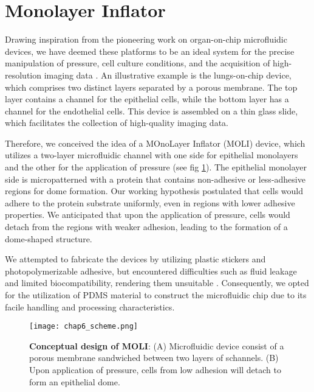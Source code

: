 \hypertarget{monolayer-inflator}{%
\section{Monolayer Inflator}\label{monolayer-inflator}}

Drawing inspiration from the pioneering work on organ-on-chip microfluidic devices, we have deemed these platforms to be an ideal system for the precise manipulation of pressure, cell culture conditions, and the acquisition of high-resolution imaging data \cite{huh2010, nelson2017}. An illustrative example is the lungs-on-chip device, which comprises two distinct layers separated by a porous membrane. The top layer contains a channel for the epithelial cells, while the bottom layer has a channel for the endothelial cells. This device is assembled on a thin glass slide, which facilitates the collection of high-quality imaging data. 

Therefore, we conceived the idea of a MOnoLayer Inflator (MOLI) device, which utilizes a two-layer microfluidic channel with one side for epithelial monolayers and the other for the application of pressure (see fig \ref{fig_6_1}). The epithelial monolayer side is micropatterned with a protein that contains non-adhesive or less-adhesive regions for dome formation. Our working hypothesis postulated that cells would adhere to the protein substrate uniformly, even in regions with lower adhesive properties. We anticipated that upon the application of pressure, cells would detach from the regions with weaker adhesion, leading to the formation of a dome-shaped structure.

We attempted to fabricate the devices by utilizing plastic stickers and photopolymerizable adhesive, but encountered difficulties such as fluid leakage and limited biocompatibility, rendering them unsuitable \cite{sollier2011, bartolo2008}. Consequently, we opted for the utilization of PDMS material to construct the microfluidic chip due to its facile handling and processing characteristics.  

\begin{figure}[h]
	\centering
	\texttt{[image: chap6\_scheme.png]}
	\caption{\textbf{Conceptual design of MOLI}: (A) Microfluidic device consist of a porous membrane sandwiched between two layers of schannels. (B) Upon application of pressure, cells from low adhesion will detach to form an epithelial dome. 
	}\label{fig_6_1}
\end{figure}


